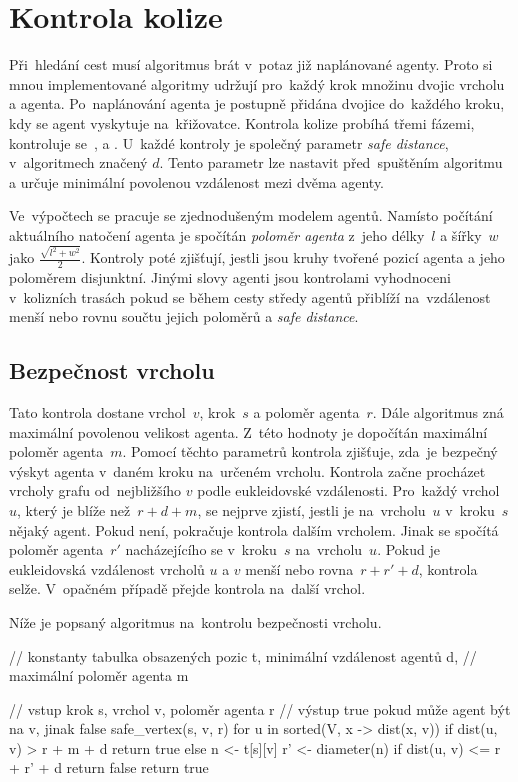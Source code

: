 \section{Kontrola kolize}\label{sec:kolize}

Při~hledání cest musí algoritmus brát v~potaz již naplánované agenty.
Proto si mnou implementované algoritmy udržují pro~každý krok množinu dvojic vrcholu a agenta.
Po~naplánování agenta je postupně přidána dvojice do~každého kroku, kdy se agent vyskytuje na~křižovatce.
Kontrola kolize probíhá třemi fázemi, kontroluje se~,
 a .
U~každé kontroly je společný parametr \emph{safe distance}, v~algoritmech značený $d$.
Tento parametr lze nastavit před~spuštěním algoritmu a určuje minimální povolenou vzdálenost mezi dvěma agenty.

Ve~výpočtech se pracuje se zjednodušeným modelem agentů.
Namísto počítání aktuálního natočení agenta je spočítán \emph{poloměr agenta}
z~jeho délky~$l$ a šířky~$w$ jako $\frac{\sqrt {l^2 + w^2}}{2}$.
Kontroly poté zjišťují, jestli jsou kruhy tvořené pozicí agenta a jeho poloměrem disjunktní.
Jinými slovy agenti jsou kontrolami vyhodnoceni v~kolizních trasách
pokud se během cesty středy agentů přiblíží na~vzdálenost menší nebo rovnu součtu jejich poloměrů a \emph{safe distance}.

\subsection{Bezpečnost vrcholu}\label{subsec:bezpecnost_vrcholu}

Tato kontrola dostane vrchol~$v$, krok~$s$ a poloměr agenta~$r$.
Dále algoritmus zná maximální povolenou velikost agenta.
Z~této hodnoty je dopočítán maximální poloměr agenta~$m$.
Pomocí těchto parametrů kontrola zjišťuje, zda~je bezpečný výskyt agenta v~daném kroku na~určeném vrcholu.
Kontrola začne procházet vrcholy grafu od~nejbližšího $v$ podle eukleidovské vzdálenosti.
Pro~každý vrchol~$u$, který je blíže než~$r + d + m$, se nejprve zjistí, jestli je na~vrcholu~$u$ v~kroku~$s$ nějaký agent.
Pokud není, pokračuje kontrola dalším vrcholem.
Jinak se spočítá poloměr agenta~$r'$ nacházejícího se v~kroku~$s$ na~vrcholu~$u$.
Pokud je eukleidovská vzdálenost vrcholů $u$ a $v$ menší nebo rovna~$r + r' + d$, kontrola selže.
V~opačném případě přejde kontrola na~další vrchol.

Níže je popsaný algoritmus na~kontrolu bezpečnosti vrcholu.
\begin{code}
// konstanty tabulka obsazených pozic t, minimální vzdálenost agentů d,
// maximální poloměr agenta m

// vstup krok s, vrchol v, poloměr agenta r
// výstup true pokud může agent být na v, jinak false
safe_vertex(s, v, r)
  for u in sorted(V, x -> dist(x, v))
    if dist(u, v) > r + m + d return true
    else
      n <- t[s][v]
      r' <- diameter(n)
      if dist(u, v) <= r + r' + d return false
  return true
\end{code}

